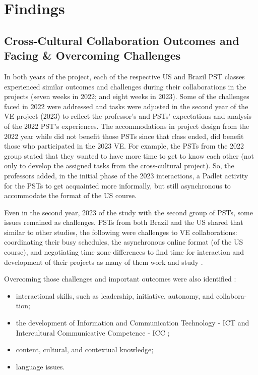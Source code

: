 \section{Findings}\label{sec-findings}
\subsection{Cross-Cultural Collaboration Outcomes and Facing \&	Overcoming Challenges}\label{sub-sec-crosscultural}
	
In both years of the project, each of the respective US and Brazil PST
classes experienced similar outcomes and challenges during their
collaborations in the projects (seven weeks in 2022; and eight weeks in
2023). Some of the challenges faced in 2022 were addressed and tasks
were adjusted in the second year of the VE project (2023) to reflect the
professor’s and PSTs’ expectations and analysis of the 2022 PST's experiences. The accommodations in project design from the 2022 year while did not benefit those PSTs since that
class ended, did benefit those who participated in the 2023 VE. For
example, the PSTs from the 2022 group stated that they wanted to have
more time to get to know each other (not only to develop the assigned
tasks from the cross-cultural project). So, the professors added, in the
initial phase of the 2023 interactions, a Padlet activity for the PSTs
to get acquainted more informally, but still asynchronous to accommodate
the format of the US course.

Even in the second year, 2023 of the study with the second group of
PSTs, some issues remained as challenges. PSTs from both Brazil and the
US shared that similar to other studies, the following were challenges
to VE collaborations: coordinating their busy schedules, the
asynchronous online format (of the US course), and negotiating time zone
differences to find time for interaction and development of their
projects as many of them work and study \cite{fuchs2017multiple,evaluate2019evaluating,kern_learning_2018}.

Overcoming those challenges and important outcomes were also identified
:

\begin{itemize}
\item	interactional skills, such as leadership, initiative, autonomy, and collabora-tion;
\item	the development of Information and Communication Technology - ICT \cite{calvo2023investigating} and Intercultural Communicative Competence - ICC \cite{idris2019intercultural,lopez2017developing};
\item	content, cultural, and contextual knowledge;
\item	language issues.
\end{itemize}
	
